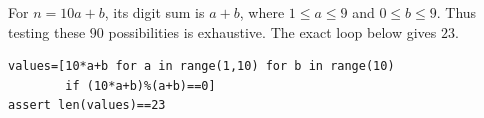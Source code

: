 For $n=10a+b$, its digit sum is $a+b$, where $1\le a\le9$ and $0\le b\le9$. Thus testing these $90$ possibilities is exhaustive. The exact loop below gives $\boxed{23}$.
\begin{verbatim}
values=[10*a+b for a in range(1,10) for b in range(10)
        if (10*a+b)%(a+b)==0]
assert len(values)==23
\end{verbatim}
